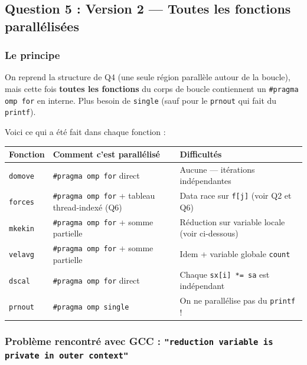 \documentclass[12pt,a4paper]{article}
\begin{document}
\subsection{Question 5 : Version 2 — Toutes les fonctions parallélisées}

\subsubsection{Le principe}

On reprend la structure de Q4 (une seule région parallèle autour de la boucle), mais cette fois \textbf{toutes les fonctions} du corps de boucle contiennent un \texttt{\#pragma omp for} en interne. Plus besoin de \texttt{single} (sauf pour le \texttt{prnout} qui fait du \texttt{printf}).

Voici ce qui a été fait dans chaque fonction :

\begin{center}
\begin{tabular}{lll}
\toprule
\textbf{\color{mainblue}Fonction} & \textbf{\color{mainblue}Comment c'est parallélisé} & \textbf{\color{mainblue}Difficultés} \\
\midrule
\texttt{domove} & \texttt{\#pragma omp for} direct & Aucune --- itérations indépendantes \\
\texttt{forces} & \texttt{\#pragma omp for} + tableau thread-indexé (Q6) & Data race sur \texttt{f[j]} (voir Q2 et Q6) \\
\texttt{mkekin} & \texttt{\#pragma omp for} + somme partielle & Réduction sur variable locale (voir ci-dessous) \\
\texttt{velavg} & \texttt{\#pragma omp for} + somme partielle & Idem + variable globale \texttt{count} \\
\texttt{dscal}  & \texttt{\#pragma omp for} direct & Chaque \texttt{sx[i] *= sa} est indépendant \\
\texttt{prnout} & \texttt{\#pragma omp single} & On ne parallélise pas du \texttt{printf} ! \\
\bottomrule
\end{tabular}
\end{center}

\subsubsection{Problème rencontré avec GCC : \texorpdfstring{\texttt{"reduction variable is private in outer context"}}{reduction variable is private in outer context}}
\end{document}
